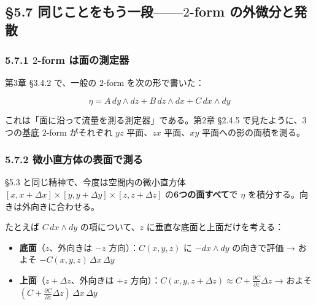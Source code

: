 \documentclass[a4paper,12pt,openany]{book}
\begin{document}
\par\vspace{0.35em}\par

\hypertarget{ux540cux3058ux3053ux3068ux3092ux3082ux3046ux4e00ux6bb52-form-ux306eux5916ux5faeux5206ux3068ux767aux6563}{%
\subsection{\texorpdfstring{§5.7 同じことをもう一段——\(2\)-form
の外微分と発散}{§5.7 同じことをもう一段——2-form の外微分と発散}}\label{ux540cux3058ux3053ux3068ux3092ux3082ux3046ux4e00ux6bb52-form-ux306eux5916ux5faeux5206ux3068ux767aux6563}}

\hypertarget{form-ux306fux9762ux306eux6e2cux5b9aux5668}{%
\subsubsection{\texorpdfstring{5.7.1 \(2\)-form
は面の測定器}{5.7.1 2-form は面の測定器}}\label{form-ux306fux9762ux306eux6e2cux5b9aux5668}}

第3章 §3.4.2 で、一般の \(2\)-form を次の形で書いた：

\[\eta = A\,dy \wedge dz + B\,dz \wedge dx + C\,dx \wedge dy\]

これは「面に沿って流量を測る測定器」である。第2章 §2.4.5
で見たように、3つの基底 \(2\)-form がそれぞれ \(yz\) 平面、\(zx\)
平面、\(xy\) 平面への影の面積を測る。

\hypertarget{ux5faeux5c0fux76f4ux65b9ux4f53ux306eux8868ux9762ux3067ux6e2cux308b}{%
\subsubsection{5.7.2
微小直方体の表面で測る}\label{ux5faeux5c0fux76f4ux65b9ux4f53ux306eux8868ux9762ux3067ux6e2cux308b}}

§5.3 と同じ精神で、今度は空間内の微小直方体
\([x, x+\Delta x] \times [y, y+\Delta y] \times [z, z+\Delta z]\)
の\textbf{6つの面すべて}で \(\eta\) を積分する。向きは外向きに合わせる。

たとえば \(C\,dx \wedge dy\) の項について、\(z\)
に垂直な底面と上面だけを考える：

\begin{itemize}
\item
  \textbf{底面}（\(z\)、外向きは \(-z\) 方向）：\(C(x,y,z)\) に
  \(-dx \wedge dy\) の向きで評価 → およそ
  \(-C(x,y,z)\,\Delta x\,\Delta y\)
\item
  \textbf{上面}（\(z+\Delta z\)、外向きは \(+z\)
  方向）：\(C(x,y,z+\Delta z) \approx C + \frac{\partial C}{\partial z}\Delta z\)
  → およそ
  \((C + \frac{\partial C}{\partial z}\Delta z)\,\Delta x\,\Delta y\)
\end{itemize}
\end{document}
